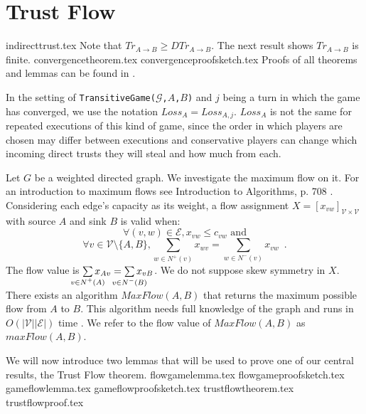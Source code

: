\section{Trust Flow}
  {indirecttrust.tex}
  \noindent Note that $Tr_{A \rightarrow B} \geq DTr_{A \rightarrow B}$. The next result shows $Tr_{A \rightarrow B}$ is
  finite.
  {convergencetheorem.tex}
  {convergenceproofsketch.tex}
  Proofs of all theorems and lemmas can be found in \cite{trustisrisk}.

  In the setting of \texttt{TransitiveGame(}$\mathcal{G}$\texttt{,}$A$\texttt{,}$B$\texttt{)} and $j$ being a turn in which
  the game has converged, we use the notation $Loss_A = Loss_{A, j}$. $Loss_A$ is not the same for repeated executions of this
  kind of game, since the order in which players are chosen may differ between executions and conservative players can change
  which incoming direct trusts they will steal and how much from each.

  Let $G$ be a weighted directed graph. We investigate the maximum flow on it. For an introduction to maximum
  flows see Introduction to Algorithms, p. 708 \cite{clrs}. Considering each edge's capacity as its weight, a flow
  assignment $X = [x_{vw}]_{\mathcal{V} \times \mathcal{V}}$ with source $A$ and sink $B$ is valid when:
  \begin{equation}
  \label{flow1}
    \forall (v, w) \in \mathcal{E}, x_{vw} \leq c_{vw} \mbox{ and}
  \end{equation}
  \begin{equation}
  \label{flow2}
    \forall v \in \mathcal{V} \setminus \{A,B\}, \sum\limits_{w \in N^{+}(v)}x_{wv} = \sum\limits_{w \in N^{-}(v)}x_{vw}
    \enspace.
  \end{equation}
  The flow value is $\sum\limits_{\mathclap{v \in N^{+}\left(A\right)}}x_{Av} = \sum\limits_{\mathclap{v \in
  N^{-}\left(B\right)}}x_{vB}$. We do not suppose skew symmetry in $X$. There exists an algorithm $MaxFlow\left(A, B\right)$
  that returns the maximum possible flow from $A$ to $B$.  This algorithm needs full knowledge of the graph and runs in
  $O\left(|\mathcal{V}||\mathcal{E}|\right)$ time \cite{maxflownm}. We refer to the flow value of $MaxFlow\left(A, B\right)$
  as $maxFlow\left(A, B\right)$.

  We will now introduce two lemmas that will be used to prove one of our central results, the Trust Flow theorem.
  {flowgamelemma.tex}
  {flowgameproofsketch.tex}
  {gameflowlemma.tex}
  {gameflowproofsketch.tex}
  {trustflowtheorem.tex}
  {trustflowproof.tex}

